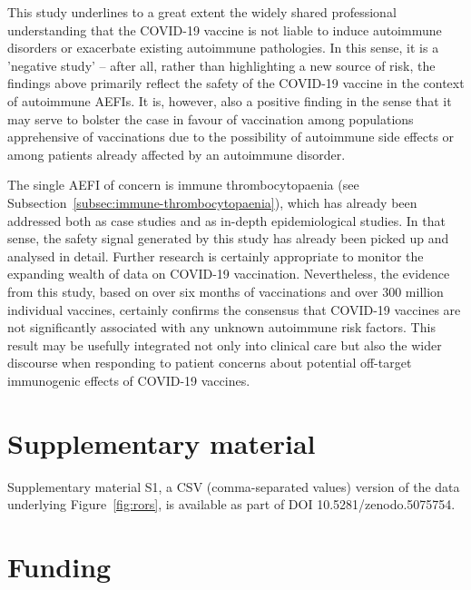 \documentclass{article}
\begin{document}
This study underlines to a great extent the widely shared professional understanding that the COVID-19 vaccine is not liable to induce autoimmune disorders or exacerbate existing autoimmune pathologies.\cite{soy2021practical,ali2021covid,furer2021point}
In this sense, it is a 'negative study'\cite{doi:10.1056/NEJM200102013440509} -- after all, rather than highlighting a new source of risk, the findings above primarily reflect the safety of the COVID-19 vaccine in the context of autoimmune AEFIs.
It is, however, also a positive finding in the sense that it may serve to bolster the case in favour of vaccination among populations apprehensive of vaccinations due to the possibility of autoimmune side effects or among patients already affected by an autoimmune disorder.

The single AEFI of concern is immune thrombocytopaenia (see Subsection~\ref{subsec:immune-thrombocytopaenia}), which has already been addressed both as case studies\cite{xie2021covid,tarawneh2021immune,tiede2021prothrombotic,pai2021vaccine} and as in-depth epidemiological studies.\cite{WELSH20213329}
In that sense, the safety signal generated by this study has already been picked up and analysed in detail.
Further research is certainly appropriate to monitor the expanding wealth of data on COVID-19 vaccination.
Nevertheless, the evidence from this study, based on over six months of vaccinations and over 300 million individual vaccines, certainly confirms the consensus that COVID-19 vaccines are not significantly associated with any unknown autoimmune risk factors.
This result may be usefully integrated not only into clinical care but also the wider discourse when responding to patient concerns about potential off-target immunogenic effects of COVID-19 vaccines.

\vspace{6pt}

\section*{Supplementary material}

Supplementary material S1, a CSV (comma-separated values) version of the data underlying Figure~\ref{fig:rors}, is available as part of DOI 10.5281/zenodo.5075754.

\section*{Funding}
\end{document}
